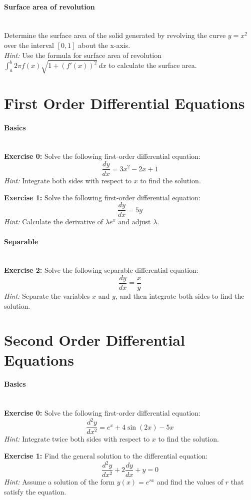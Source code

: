 \documentclass[]{article}
\begin{document}
	\paragraph{Surface area of revolution}\mbox{}\\
	Determine the surface area of the solid generated by revolving the curve \(y = x^2\) over the interval \([0, 1]\) about the x-axis.\\
	\textit{Hint:} Use the formula for surface area of revolution \(\int_a^b 2\pi f(x) \sqrt{1 + (f'(x))^2} \, dx\) to calculate the surface area.
	
	
	\section{First Order Differential Equations}
	\paragraph{Basics}\mbox{}\\
	\textbf{Exercise 0:}
	Solve the following first-order differential equation:
	\[
	\frac{dy}{dx} = 3x^2 - 2x + 1
	\]
	\textit{Hint:} Integrate both sides with respect to \(x\) to find the solution.
	
	\textbf{Exercise 1:}
	Solve the following first-order differential equation:
	\[
	\frac{dy}{dx} = 5y
	\]
	\textit{Hint:} Calculate the derivative of $\lambda e^x$ and adjust $\lambda$.
	
	\paragraph{Separable}\mbox{}\\
	\textbf{Exercise 2:}
	Solve the following separable differential equation:
	\[
	\frac{dy}{dx} = \frac{x}{y}
	\]
	\textit{Hint:} Separate the variables \(x\) and \(y\), and then integrate both sides to find the solution.
	
	\section{Second Order Differential Equations}
	\paragraph{Basics}\mbox{}\\
	\textbf{Exercise 0:}
	Solve the following first-order differential equation:
	\[
	\frac{d^2y}{dx^2} = e^x + 4\sin(2x) - 5x
	\]
	\textit{Hint:} Integrate twice both sides with respect to \(x\) to find the solution.
	
	\textbf{Exercise 1:}
	Find the general solution to the differential equation:
	\[
	\frac{d^2y}{dx^2} + 2\frac{dy}{dx} + y = 0
	\]
	\textit{Hint:} Assume a solution of the form \(y(x) = e^{rx}\) and find the values of \(r\) that satisfy the equation.
	
\end{document}
